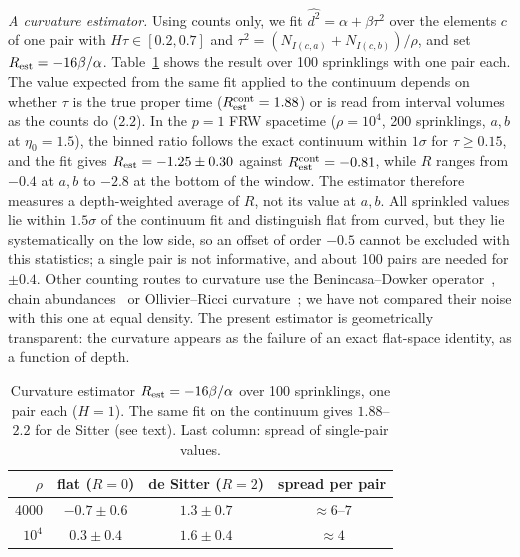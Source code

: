 \documentclass[prd,twocolumn,superscriptaddress,nofootinbib,amsmath,amssymb,floatfix]{revtex4-2}
\begin{document}
\emph{A curvature estimator.} Using counts only, we fit $\widehat{d^2}=\alpha+\beta\tau^2$ over the elements $c$ of one pair with $H\tau\in[0.2,0.7]$ and $\tau^2=(N_{I(c,a)}+N_{I(c,b)})/\rho$, and set $R_{\rm est}=-16\beta/\alpha$. Table~\ref{tab:rest} shows the result over 100 sprinklings with one pair each. The value expected from the same fit applied to the continuum depends on whether $\tau$ is the true proper time ($R_{\rm est}^{\rm cont}=1.88$) or is read from interval volumes as the counts do ($2.2$). In the $p=1$ FRW spacetime ($\rho=10^4$, 200 sprinklings, $a,b$ at $\eta_0=1.5$), the binned ratio follows the exact continuum within $1\sigma$ for $\tau\geq0.15$, and the fit gives $R_{\rm est}=-1.25\pm0.30$ against $R_{\rm est}^{\rm cont}=-0.81$, while $R$ ranges from $-0.4$ at $a,b$ to $-2.8$ at the bottom of the window. The estimator therefore measures a depth-weighted average of $R$, not its value at $a,b$. All sprinkled values lie within $1.5\sigma$ of the continuum fit and distinguish flat from curved, but they lie systematically on the low side, so an offset of order $-0.5$ cannot be excluded with this statistics; a single pair is not informative, and about 100 pairs are needed for $\pm0.4$. Other counting routes to curvature use the Benincasa--Dowker operator~\cite{BD10}, chain abundances~\cite{RSS13} or Ollivier--Ricci curvature~\cite{BBR26}; we have not compared their noise with this one at equal density. The present estimator is geometrically transparent: the curvature appears as the failure of an exact flat-space identity, as a function of depth.

\begin{table}[t]
\caption{Curvature estimator $R_{\rm est}=-16\beta/\alpha$ over 100 sprinklings, one pair each ($H=1$). The same fit on the continuum gives $1.88$--$2.2$ for de Sitter (see text). Last column: spread of single-pair values.}
\label{tab:rest}
\begin{ruledtabular}
\begin{tabular}{rccc}
$\rho$ & flat ($R=0$) & de Sitter ($R=2$) & spread per pair\\
\hline
4000 & $-0.7\pm0.6$ & $1.3\pm0.7$ & $\approx6$--$7$\\
$10^4$ & $0.3\pm0.4$ & $1.6\pm0.4$ & $\approx4$\\
\end{tabular}
\end{ruledtabular}
\end{table}
\end{document}
